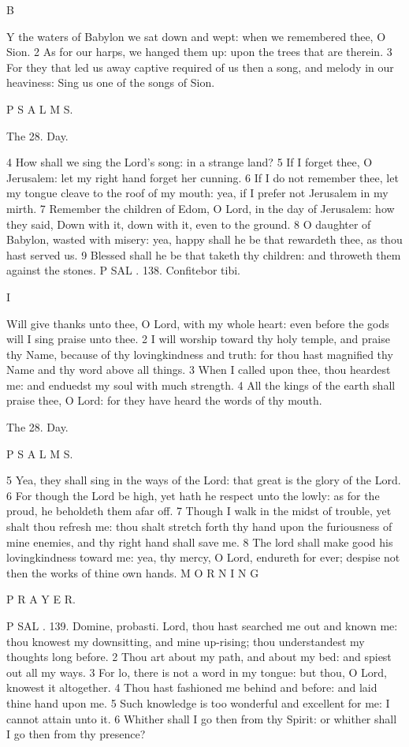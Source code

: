 B

Y the waters of Babylon we sat down and wept: when we remembered thee, O Sion. 2 As for our harps, we hanged them up: upon the trees that are therein. 3 For they that led us away captive required of us then a song, and melody in our heaviness: Sing us one of the songs of Sion.

P S A L M S.

The 28. Day.

4 How shall we sing the Lord’s song: in a strange land? 5 If I forget thee, O Jerusalem: let my right hand forget her cunning. 6 If I do not remember thee, let my tongue cleave to the roof of my mouth: yea, if I prefer not Jerusalem in my mirth. 7 Remember the children of Edom, O Lord, in the day of Jerusalem: how they said, Down with it, down with it, even to the ground. 8 O daughter of Babylon, wasted with misery: yea, happy shall he be that rewardeth thee, as thou hast served us. 9 Blessed shall he be that taketh thy children: and throweth them against the stones. P SAL . 138. Confitebor tibi.

I

Will give thanks unto thee, O Lord, with my whole heart: even before the gods will I sing praise unto thee. 2 I will worship toward thy holy temple, and praise thy Name, because of thy lovingkindness and truth: for thou hast magnified thy Name and thy word above all things. 3 When I called upon thee, thou heardest me: and enduedst my soul with much strength. 4 All the kings of the earth shall praise thee, O Lord: for they have heard the words of thy mouth.

The 28. Day.

P S A L M S.

5 Yea, they shall sing in the ways of the Lord: that great is the glory of the Lord. 6 For though the Lord be high, yet hath he respect unto the lowly: as for the proud, he beholdeth them afar off. 7 Though I walk in the midst of trouble, yet shalt thou refresh me: thou shalt stretch forth thy hand upon the furiousness of mine enemies, and thy right hand shall save me. 8 The lord shall make good his lovingkindness toward me: yea, thy mercy, O Lord, endureth for ever; despise not then the works of thine own hands. M O R N I N G

P R A Y E R.

P SAL . 139. Domine, probasti. Lord, thou hast searched me out and known me: thou knowest my downsitting, and mine up-rising; thou understandest my thoughts long before. 2 Thou art about my path, and about my bed: and spiest out all my ways. 3 For lo, there is not a word in my tongue: but thou, O Lord, knowest it altogether. 4 Thou hast fashioned me behind and before: and laid thine hand upon me. 5 Such knowledge is too wonderful and excellent for me: I cannot attain unto it. 6 Whither shall I go then from thy Spirit: or whither shall I go then from thy presence?

